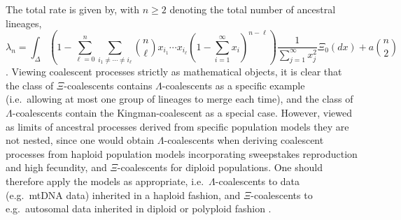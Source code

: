 \documentclass{article}
\newcommand{\be}{\begin{equation}}
\newcommand{\ee}{\end{equation}}
\begin{document}
The total rate is given by, with
$n\ge 2$ denoting the total  number of ancestral lineages,
\be
  \label{Xilambdab}
  \lambda_{n} = \int_\Delta \left(1 - \sum_{\ell = 0}^n \sum_{i_1 \neq
  \cdots \neq i_\ell } \binom{n}{\ell} x_{i_1}\cdots x_{i_\ell}\left(1
  - \sum_{i=1}^\infty x_i\right)^{n-\ell} \right)
  \frac{1}{\sum_{j=1}^\infty x_j^2}\Xi_0(dx) + a\binom{n}{2} \ee
  \citep{S00}.  Viewing coalescent processes strictly as mathematical
  objects, it is clear that the class of $\Xi$-coalescents contains
  $\Lambda$-coalescents as a specific example (i.e.\ allowing at most
  one group of lineages to merge each time), and the class of
  $\Lambda$-coalescents contain the Kingman-coalescent as a special
  case.  However, viewed as limits of ancestral processes derived from
  specific population models they are not nested, since one would
  obtain $\Lambda$-coalescents when deriving coalescent processes from
  haploid population models incorporating sweepstakes reproduction and
  high fecundity, and $\Xi$-coalescents for diploid populations.  One
  should therefore apply the models as appropriate, i.e.\
  $\Lambda$-coalescents to data (e.g.\ mtDNA data) inherited in a
  haploid fashion, and $\Xi$-coalescents to e.g.\ autosomal data
  inherited in diploid or polyploid fashion \citep{Blath2016}.
\end{document}
